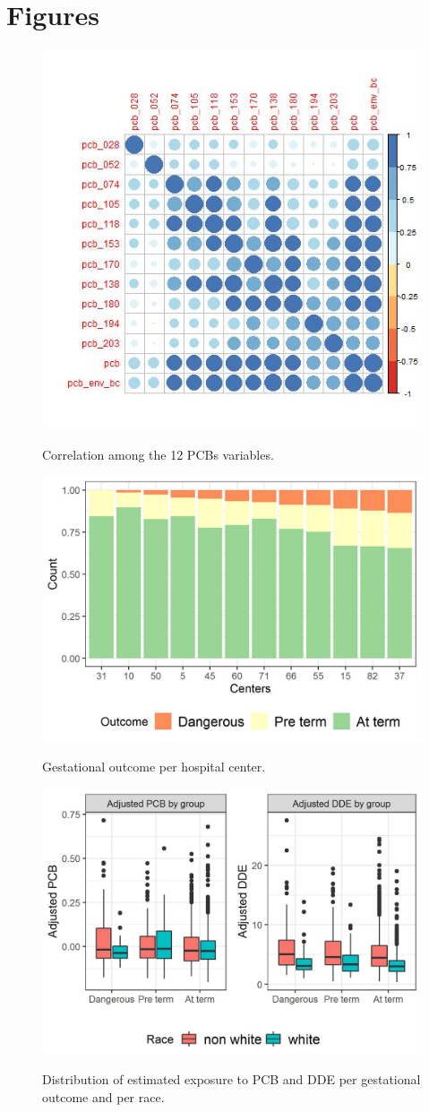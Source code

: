 \documentclass[wcp]{jmlr}%
\begin{document}
\section{Figures}
\label{appendix:fig}

\begin{figure}[htbp]
	\centering
	\caption{Correlation among the 12 PCBs variables.}
	\includegraphics[width=0.5\linewidth]{pcb_corr}
	\label{fig:corr}
\end{figure}

\begin{figure}[htbp]
	\centering
	\caption{Gestational outcome per hospital center.}
	\includegraphics[width=0.7\linewidth]{outcome_per_center}
	\label{fig:center}
\end{figure}

\begin{figure}[htbp]
	\centering
	\caption{Distribution of estimated exposure to PCB and DDE per gestational outcome and per race.}
	\includegraphics[width=0.7\linewidth]{pcb_dde_per_gest}
	\label{fig:pcb}
\end{figure}
\end{document}
